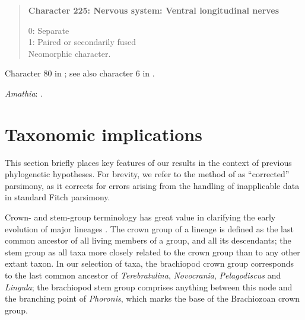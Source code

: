 \documentclass[openany]{book}
\begin{document}
\begin{quote}
\textbf{Character 225: Nervous system: Ventral longitudinal nerves}

0: Separate\\
1: Paired or secondarily fused\\
Neomorphic character.
\end{quote}

Character 80 in \citet{Glenner2004}; see also character 6 in
\citet{Vinther2008}.

\hypertarget{Amathia-coding-225}{}
\emph{Amathia}: \citet{Temereva2016Thenervous}.

\chapter{Taxonomic implications}\label{taxonomic-implications}

This section briefly places key features of our results in the context
of previous phylogenetic hypotheses. For brevity, we refer to the method
of \citet{Brazeau2018} as ``corrected'' parsimony, as it corrects for
errors arising from the handling of inapplicable data in standard Fitch
parsimony.

Crown- and stem-group terminology has great value in clarifying the
early evolution of major lineages \citep{Budd2000, Carlson2009}. The
crown group of a lineage is defined as the last common ancestor of all
living members of a group, and all its descendants; the stem group as
all taxa more closely related to the crown group than to any other
extant taxon. In our selection of taxa, the brachiopod crown group
corresponds to the last common ancestor of \emph{Terebratulina},
\emph{Novocrania}, \emph{Pelagodiscus} and \emph{Lingula}; the
brachiopod stem group comprises anything between this node and the
branching point of \emph{Phoronis}, which marks the base of the
Brachiozoan crown group.
\end{document}
